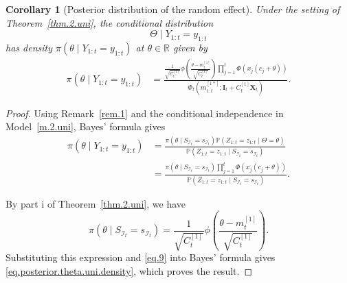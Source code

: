 \documentclass[11pt,authoryear]{elsarticle}
\def\Real{\mathbb{R}}
\def\P#1{{\mathbb{P}}\left(#1\right)}
\newtheorem{corollary}{Corollary}
\theoremstyle{nopunct}
\numberwithin{equation}{section}
\begin{document}
\begin{corollary}[Posterior distribution of the random effect]
\label{cor.posterior.uni}
Under the setting of Theorem~\ref{thm.2.uni},
the conditional distribution
\[
\Theta\mid Y_{1:t}=y_{1:t}
\]
has density \(\pi(\theta\mid Y_{1:t}=y_{1:t})\) at
\(\theta\in\Real\) given by
\begin{equation}\label{eq.posterior.theta.uni.density}
\begin{aligned}
\pi(\theta\mid Y_{1:t}=y_{1:t})
&=
\frac{
\displaystyle
\frac{1}{\sqrt{C_t^{[1]}}}
\phi\left(
\frac{\theta-m_t^{[1]}}{\sqrt{C_t^{[1]}}}
\right)
\prod_{j=1}^t
\Phi\left(
x_j(c_j+\theta)
\right)
}{
\Phi_t
\left(
m_{1:t}^{[1*]};
\boldsymbol I_t
+
C_t^{[1]}\boldsymbol X_t
\right)
}.
\end{aligned}
\end{equation}
\end{corollary}

\begin{proof}
Using Remark~\ref{rem.1} and the conditional independence in
Model~\ref{m.2.uni}, Bayes' formula gives
\[
\begin{aligned}
\pi(
\theta
\mid
Y_{1:t}=y_{1:t}
)&=
\frac{
\pi(
\theta
\mid
S_{\mathcal I_t}=s_{\mathcal I_t}
)
\P{
Z_{1:t}=z_{1:t}
\mid
\Theta=\theta
}
}{
\P{
Z_{1:t}=z_{1:t}
\mid
S_{\mathcal I_t}=s_{\mathcal I_t}
}
}\\
&=
\frac{
\pi(
\theta
\mid
S_{\mathcal I_t}=s_{\mathcal I_t}
)
\displaystyle\prod_{j=1}^t
\Phi\left(
x_j(c_j+\theta)
\right)
}{
\P{
Z_{1:t}=z_{1:t}
\mid
S_{\mathcal I_t}=s_{\mathcal I_t}
}
}.
\end{aligned}
\]

By part i of Theorem~\ref{thm.2.uni}, we have
\[
\pi(
\theta
\mid
S_{\mathcal I_t}=s_{\mathcal I_t}
)
=
\frac{1}{\sqrt{C_t^{[1]}}}
\phi\left(
\frac{\theta-m_t^{[1]}}{\sqrt{C_t^{[1]}}}
\right).
\]
Substituting this expression and \eqref{eq.9} into Bayes' formula
gives \eqref{eq.posterior.theta.uni.density}, which proves the result.
\end{proof}
\end{document}
